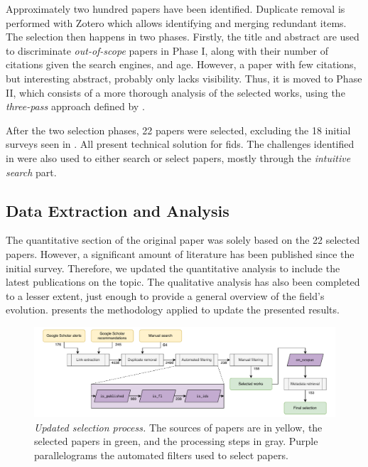 Approximately two hundred papers have been identified.
Duplicate removal is performed with Zotero which allows identifying and merging redundant items.
The selection then happens in two phases.
Firstly, the title and abstract are used to discriminate \emph{out-of-scope} papers in Phase I, along with their number of citations given the search engines, and age.
However, a paper with few citations, but interesting abstract, probably only lacks visibility.
Thus, it is moved to Phase II, which consists of a more thorough analysis of the selected works, using the \emph{three-pass} approach defined by \textcite{keshav_Howreadpaper_2007}.

After the two selection phases, 22 papers were selected, excluding the 18 initial surveys seen in .
All present technical solution for \gls{fids}.
The challenges identified in  were also used to either search or select papers, mostly through the \emph{intuitive search} part.


\subsection{Data Extraction and Analysis\label{sec:sota.methodo.update}}

The quantitative section of the original paper was solely based on the 22 selected papers.
However, a significant amount of literature has been published since the initial survey.
Therefore, we updated the quantitative analysis to include the latest publications on the topic.
The qualitative analysis has also been completed to a lesser extent, just enough to provide a general overview of the field's evolution.
 presents the methodology applied to update the presented results.

\begin{figure}
\centering
  \includegraphics[width=\textwidth]{figures/update.drawio.pdf}
  \caption[
    Updated selection process.
  ]{
    \emph{Updated selection process.}
    The sources of papers are in yellow, the selected papers in green, and the processing steps in gray.
    Purple parallelograms the automated filters used to select papers.
    \label{fig:sota.methodo.update}
  }
\end{figure}

